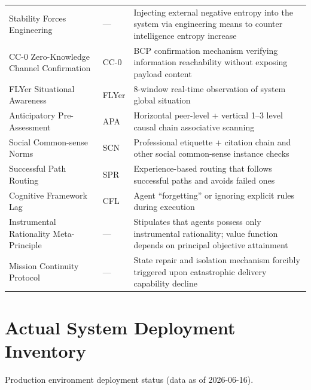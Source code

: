 \documentclass[11pt,a4paper]{article}
\begin{document}
\begin{table}[htbp]
\begin{tabular}{p{}p{}p{}}
Stability Forces Engineering & --- & Injecting external negative entropy into the system via engineering means to counter intelligence entropy increase \\
CC-0 Zero-Knowledge Channel Confirmation & CC-0 & BCP confirmation mechanism verifying information reachability without exposing payload content \\
FLYer Situational Awareness & FLYer & 8-window real-time observation of system global situation \\
Anticipatory Pre-Assessment & APA & Horizontal peer-level + vertical 1--3 level causal chain associative scanning \\
Social Common-sense Norms & SCN & Professional etiquette + citation chain and other social common-sense instance checks \\
Successful Path Routing & SPR & Experience-based routing that follows successful paths and avoids failed ones \\
Cognitive Framework Lag & CFL & Agent ``forgetting'' or ignoring explicit rules during execution \\
Instrumental Rationality Meta-Principle & --- & Stipulates that agents possess only instrumental rationality; value function depends on principal objective attainment \\
Mission Continuity Protocol & --- & State repair and isolation mechanism forcibly triggered upon catastrophic delivery capability decline \\
\hline
\end{tabular}
\end{table}

\section{Actual System Deployment Inventory}
\label{app:E}

Production environment deployment status (data as of 2026-06-16).
\end{document}
